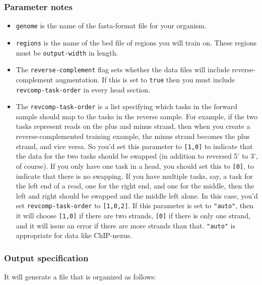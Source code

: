 \documentclass{article}
\begin{document}
\subsubsection{Parameter notes}
\begin{itemize}
    \item \texttt{genome} is the name of the fasta-format file for your
        organism.
    \item \texttt{regions} is the name of the bed file of regions you will
        train on.
        These regions must be \texttt{output-width} in length.
    \item The \texttt{reverse-complement} flag sets whether the data files will
        include reverse-complement augmentation.
        If this is set to \texttt{true} then you must include
        \texttt{revcomp-task-order} in every head section.
    \item The \texttt{revcomp-task-order} is a list specifying which tasks in
        the forward sample should map to the tasks in the reverse sample.
        For example, if the two tasks represent reads on the plus and minus
        strand, then when you create a reverse-complemented training example,
        the minus strand becomes the plus strand, and vice versa.
        So you'd set this parameter to \texttt{[1,0]} to indicate that the data
        for the two tasks should be swapped (in addition to reversed 5' to 3',
        of course).
        If you only have one task in a head, you should set this to
        \texttt{[0]}, to indicate that there is no swapping.
        If you have multiple tasks, say, a task for the left end of a read,
        one for the right end, and one for the middle, then the left and right
        should be swapped and the middle left alone.
        In this case, you'd set \texttt{revcomp-task-order} to \texttt{[1,0,2]}.
        If this parameter is set to \texttt{"auto"}, then it will choose
        \texttt{[1,0]} if there are two strands, \texttt{[0]} if there is only
        one strand, and it will issue an error if there are more strands than
        that.
        \texttt{"auto"} is appropriate for data like ChIP-nexus.
\end{itemize}

\subsubsection{Output specification}

It will generate a file that is organized as follows:
\end{document}
